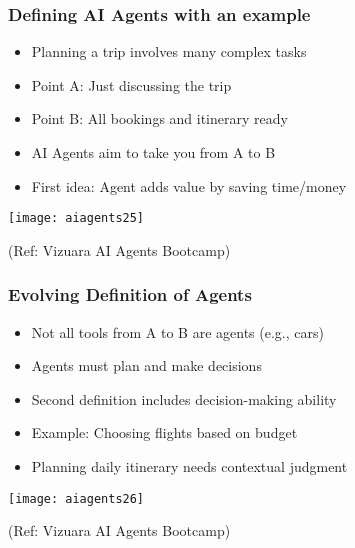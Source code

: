 \begin{frame}[fragile]\frametitle{Defining AI Agents with an example}

      \begin{itemize}
		\item Planning a trip involves many complex tasks
		\item Point A: Just discussing the trip
		\item Point B: All bookings and itinerary ready
		\item AI Agents aim to take you from A to B
		\item First idea: Agent adds value by saving time/money
      \end{itemize}

		\begin{center}
		\texttt{[image: aiagents25]}
		
		{\tiny (Ref: Vizuara AI Agents Bootcamp)}
		\end{center}	

\end{frame}

\begin{frame}[fragile]\frametitle{Evolving Definition of Agents}

      \begin{itemize}
		\item Not all tools from A to B are agents (e.g., cars)
		\item Agents must plan and make decisions
		\item Second definition includes decision-making ability
		\item Example: Choosing flights based on budget
		\item Planning daily itinerary needs contextual judgment
      \end{itemize}

		\begin{center}
		\texttt{[image: aiagents26]}
		
		{\tiny (Ref: Vizuara AI Agents Bootcamp)}
		\end{center}	

\end{frame}

